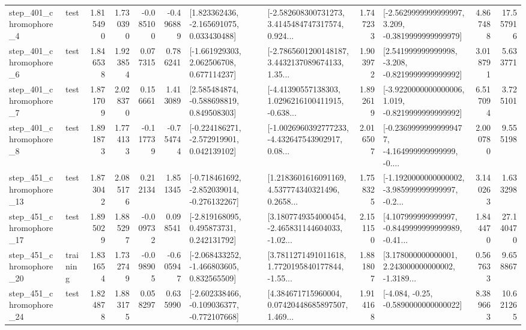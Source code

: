\begin{tabular}{llrrrrllrlrr}
   step\_401\_chromophore\_4 &      test &      1.815490 &    1.730390 &     -0.085100 & -0.496889 &    [1.823362436, -2.165691075, 0.033430488] &  [-2.582608300731273, 3.4145484747317574, 0.924... &       1.747233 &  [-2.5629999999999997, 3.209, -0.3819999999999979] &            4.867488 &         17.557916 \\
   step\_401\_chromophore\_6 &      test &      1.846538 &    1.923854 &      0.077315 &  0.786241 &    [-1.661929303, 2.062506708, 0.677114237] &  [-2.7865601200148187, 3.4432137089674133, 1.35... &       1.903972 &   [2.541999999999998, -3.208, -0.8219999999999992] &            3.018791 &          5.633771 \\
   step\_401\_chromophore\_7 &      test &      1.871709 &    2.028370 &      0.156661 &  1.413089 &    [2.585484874, -0.588698819, 0.849508303] &  [-4.41390557138303, 1.0296216100411915, -0.638... &       1.892619 &  [-3.9220000000000006, 1.019, -0.8219999999999992] &            6.517094 &          3.725101 \\
   step\_401\_chromophore\_8 &      test &      1.891873 &    1.774133 &     -0.117739 & -0.754744 &   [-0.224186271, -2.572919901, 0.042139102] &  [-1.0026960392777233, -4.432647543902917, 0.08... &       2.016507 &  [-0.23699999999999477, -4.164999999999999, -0.... &            2.000780 &          9.555198 \\
  step\_451\_chromophore\_13 &      test &      1.873042 &    2.085176 &      0.212134 &  1.851345 &  [-0.718461692, -2.852039014, -0.276132267] &  [1.2183601616091169, 4.537774340321496, 0.2658... &       1.758325 &  [-1.1920000000000002, -3.985999999999997, -0.2... &            3.140263 &          1.633298 \\
  step\_451\_chromophore\_17 &      test &      1.895029 &    1.885297 &     -0.009732 &  0.098541 &    [-2.819168095, 0.495873731, 0.242131792] &  [3.1807749354000454, -2.465831144604033, -1.02... &       2.151150 &  [4.107999999999997, -0.8449999999999989, -0.41... &            1.844470 &         27.140470 \\
  step\_451\_chromophore\_20 &  training &      1.831654 &    1.732749 &     -0.098905 & -0.605947 &   [-2.068433252, -1.466803605, 0.832565509] &  [3.7811271491011618, 1.7720195840177844, -1.55... &       1.881807 &  [3.178000000000001, 2.243000000000002, -1.3189... &            0.567633 &          9.658867 \\
  step\_451\_chromophore\_24 &      test &      1.824878 &    1.883175 &      0.058297 &  0.635990 &  [-2.602338466, -0.109036377, -0.772107668] &  [4.384671715960004, 0.07420448685897507, 1.469... &       1.914168 &               [-4.084, -0.25, -0.5890000000000022] &            8.389663 &         10.621265 \\

\end{tabular}
